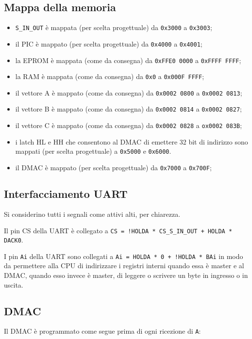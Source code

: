 \documentclass[a4paper]{article}
\begin{document}
\subsection{Mappa della memoria}
\begin{itemize}
\item \texttt{S\_IN\_OUT} è mappata (per scelta progettuale) da \texttt{0x3000} a \texttt{0x3003};
\item il PIC è mappato (per scelta progettuale) da \texttt{0x4000} a \texttt{0x4001};
\item la EPROM è mappata (come da consegna) da \texttt{0xFFE0 0000} a \texttt{0xFFFF FFFF};
\item la RAM è mappata (come da consegna) da \texttt{0x0} a \texttt{0x000F FFFF};
\item il vettore A è mappato (come da consegna) da \texttt{0x0002 0800} a \texttt{0x0002 0813};
\item il vettore B è mappato (come da consegna) da \texttt{0x0002 0814} a \texttt{0x0002 0827};
\item il vettore C è mappato (come da consegna) da \texttt{0x0002 0828} a \texttt{ox0002 083B};
\item i latch HL e HH che consentono al DMAC di emettere 32 bit di indirizzo sono mappati (per scelta progettuale) a \texttt{0x5000} e \texttt{0x6000}.
\item il DMAC è mappato (per scelta progettuale) da \texttt{0x7000} a \texttt{0x700F};
\end{itemize}

\subsection{Interfacciamento UART}
Si considerino tutti i segnali come attivi alti, per chiarezza.

Il pin CS della UART è collegato a \texttt{CS = !HOLDA * CS\_S\_IN\_OUT + HOLDA * DACK0}.

I pin \texttt{Ai} della UART sono collegati a \texttt{Ai = HOLDA * 0 + !HOLDA * BAi} in modo da permettere alla CPU di indirizzare i registri interni quando essa è master e al DMAC, quando esso invece è master, di leggere o scrivere un byte in ingresso o in uscita.

\subsection{DMAC}

Il DMAC è programmato come segue prima di ogni ricezione di \texttt{A}:
\end{document}
